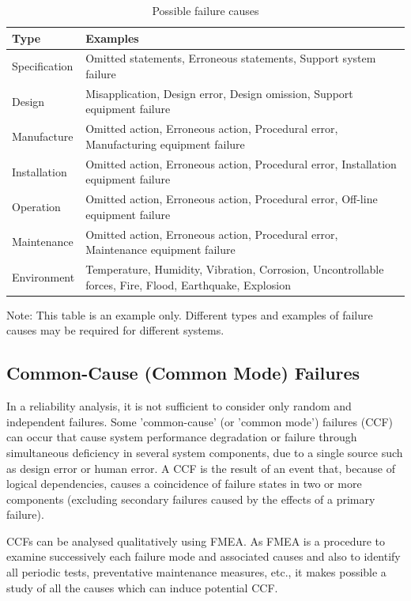 \documentclass[./dissertation.tex]{subfiles}
\begin{document}
\begin{table}[H]
\centering
\caption{Possible failure causes}
\label{tab:failure-causes2}
\begin{tabular}{|l|l|}
\hline
\textbf{Type} & \textbf{Examples} \\
\hline
Specification & Omitted statements, Erroneous statements, Support system failure \\
\hline
Design & Misapplication, Design error, Design omission, Support equipment failure \\
\hline
Manufacture & Omitted action, Erroneous action, Procedural error, Manufacturing equipment failure \\
\hline
Installation & Omitted action, Erroneous action, Procedural error, Installation equipment failure \\
\hline
Operation & Omitted action, Erroneous action, Procedural error, Off-line equipment failure \\
\hline
Maintenance & Omitted action, Erroneous action, Procedural error, Maintenance equipment failure \\
\hline
Environment & Temperature, Humidity, Vibration, Corrosion, Uncontrollable forces, Fire, Flood, Earthquake, Explosion \\
\hline
\end{tabular}
\end{table}

Note: This table is an example only. Different types and examples of failure causes may be required for different systems.


\subsection{Common-Cause (Common Mode) Failures}
In a reliability analysis, it is not sufficient to consider only random and independent failures. Some 'common-cause' (or 'common mode') failures (CCF) can occur that cause system performance degradation or failure through simultaneous deficiency in several system components, due to a single source such as design error or human error. A CCF is the result of an event that, because of logical dependencies, causes a coincidence of failure states in two or more components (excluding secondary failures caused by the effects of a primary failure).

CCFs can be analysed qualitatively using FMEA. As FMEA is a procedure to examine successively each failure mode and associated causes and also to identify all periodic tests, preventative maintenance measures, etc., it makes possible a study of all the causes which can induce potential CCF.
\end{document}
